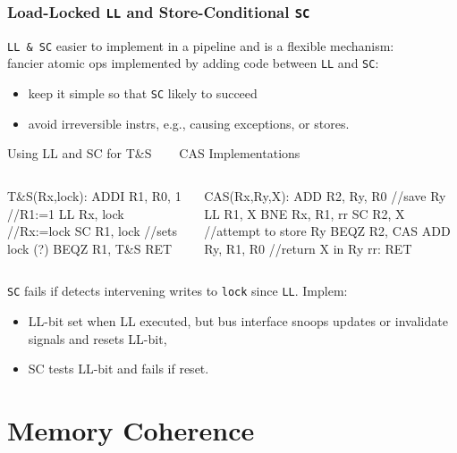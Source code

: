 \documentclass{beamer}
\newcommand{\emp}[1]{\textcolor{DikuRed}{ #1}}
\begin{document}
\begin{frame}[fragile,t]
\frametitle{Load-Locked {\tt LL} and Store-Conditional {\tt SC}}

\emp{\tt LL \& SC} easier to implement in a pipeline and is a flexible mechanism:\\
fancier atomic ops implemented by adding code between {\tt LL} and {\tt SC}:
\begin{itemize}
    \item keep it simple so that {\tt SC} likely to succeed
    \item avoid irreversible instrs, e.g., causing exceptions, or stores.
\end  {itemize}

\begin{block}{Using LL and SC for T\&S {\tt~~~} CAS Implementations}\vspace{-2ex}
\begin{columns}
\begin{colorcode}[fontsize=\scriptsize]
T\&S(Rx,lock):
    ADDI R1, R0, 1 //R1:=1
    LL   Rx, lock  //Rx:=lock
    SC   R1, lock  //sets lock (?)
    BEQZ R1, T\&S
    RET


\end{colorcode} 
\begin{colorcode}[fontsize=\scriptsize]
CAS(Rx,Ry,X):
    ADD  R2, Ry, R0 //save Ry
    LL   R1, X
    BNE  Rx, R1, rr
    SC   R2, X      //attempt to store Ry
    BEQZ R2, CAS
    ADD  Ry, R1, R0 //return X in Ry
rr: RET
\end{colorcode} 
\end{columns}
\end{block}

{\tt SC} fails if detects intervening writes to {\tt lock} since {\tt LL}. Implem:
\begin{itemize}
    \item LL-bit set when LL executed, but bus interface snoops updates or 
            invalidate signals and resets LL-bit,
    \item SC tests LL-bit and fails if reset.
\end  {itemize}
\end{frame}


\section{Memory Coherence}
\end{document}

